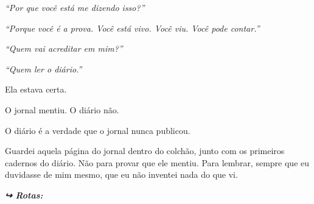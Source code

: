 \noindent \textit{\textquotedblleft{}Por que você está me dizendo isso?\textquotedblright{}}

\noindent \textit{\textquotedblleft{}Porque você é a prova. Você está vivo. Você viu. Você pode contar.\textquotedblright{}}

\noindent \textit{\textquotedblleft{}Quem vai acreditar em mim?\textquotedblright{}}

\noindent \textit{\textquotedblleft{}Quem ler o diário.\textquotedblright{}}

\noindent Ela estava certa.

\noindent O jornal mentiu.
O diário não.

\noindent O diário é a verdade que o jornal nunca publicou.

\noindent Guardei aquela página do jornal dentro do colchão, junto com os primeiros cadernos do diário. Não para provar que ele mentiu. Para lembrar, sempre que eu duvidasse de mim mesmo, que eu não inventei nada do que vi.

\vspace{0.5em}
\noindent\textit{\textbf{↪ Rotas:}  \rotasep {}}